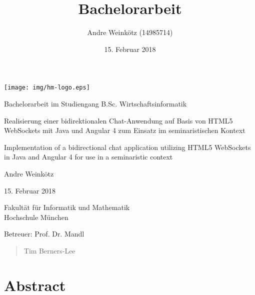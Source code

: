 \documentclass[11pt,a4paper,titlepage]{scrartcl}
\title{Bachelorarbeit}
\author{Andre Weinkötz (14985714)}
\date{15. Februar 2018}
\numberwithin{equation}{section}
\begin{document}
  \pagestyle{empty}
  \renewcommand{\thelstlisting}{\arabic{section}.\arabic{lstlisting}}
\begin{titlepage}

\begin{center}
	\texttt{[image: img/hm-logo.eps]}
\end{center}
 \bigskip

 \begin{center} \large 
    
    Bachelorarbeit im Studiengang B.Sc. Wirtschaftsinformatik
    \vspace*{2cm}
\end{center}
\begin{doublespace}
	{\huge Realisierung einer bidirektionalen Chat-Anwendung auf Basis von HTML5 WebSockets mit Java und Angular 4 zum Einsatz im seminaristischen Kontext}\\
\vspace{1.5cm}

	{\huge \noindent Implementation of a bidirectional chat application utilizing HTML5 WebSockets in Java and Angular 4 for use in a seminaristic context}
\end{doublespace}

    
    \vspace*{2.0cm}
 \begin{center}
    Andre Weinkötz \bigskip
    
    

    15. Februar 2018
    \vspace*{2.5cm}
    
    

    Fakultät für Informatik und Mathematik \\
	Hochschule München\bigskip
	
	Betreuer: Prof. Dr. Mandl 
	
	
  \end{center}
\end{titlepage}
\newpage
\vspace*{9cm}
\begin{quote}
\medskip
	Tim Berners-Lee
\end{quote}
\newpage
\section*{Abstract}
\end{document}
